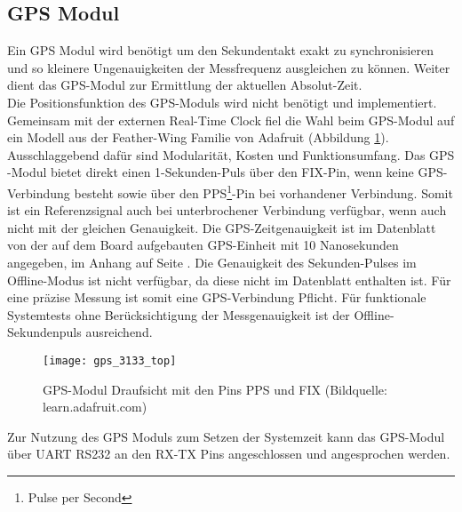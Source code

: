 \subsection{GPS Modul}
\label{cap:gps_modul}
	Ein GPS Modul wird benötigt um den Sekundentakt exakt zu synchronisieren und so kleinere Ungenauigkeiten der Messfrequenz ausgleichen zu können. Weiter dient das GPS-Modul zur Ermittlung der aktuellen Absolut-Zeit.\\
	Die Positionsfunktion des GPS-Moduls wird nicht benötigt und implementiert. Gemeinsam mit der externen Real-Time Clock fiel die Wahl beim GPS-Modul auf ein Modell aus der Feather-Wing Familie von Adafruit (Abbildung \ref{fig:GPS3133}).
	Ausschlaggebend dafür sind Modularität, Kosten und Funktionsumfang. Das GPS -Modul bietet direkt einen 1-Sekunden-Puls über den FIX-Pin, wenn keine GPS-Verbindung besteht sowie über den PPS\footnote{Pulse per Second}-Pin bei vorhandener Verbindung. Somit ist ein Referenzsignal auch bei unterbrochener Verbindung verfügbar, wenn auch nicht mit der gleichen Genauigkeit.
	Die GPS-Zeitgenauigkeit ist im Datenblatt von der auf dem Board aufgebauten GPS-Einheit mit 10 Nanosekunden angegeben, im Anhang auf Seite \pageref{app:gps_occuracy}. 
	Die Genauigkeit des Sekunden-Pulses im Offline-Modus ist nicht verfügbar, da diese nicht im Datenblatt enthalten ist. Für eine präzise Messung ist somit eine GPS-Verbindung Pflicht. Für funktionale Systemtests ohne Berücksichtigung der Messgenauigkeit ist der Offline-Sekundenpuls ausreichend.
		\begin{figure}[H]
        	\centering
        	\texttt{[image: gps\_3133\_top]}
        	\caption{GPS-Modul Draufsicht mit den Pins PPS und FIX (Bildquelle: learn.adafruit.com)}
        	\label{fig:GPS3133}
    	\end{figure}
	\noindent Zur Nutzung des GPS Moduls zum Setzen der Systemzeit kann das GPS-Modul über UART RS232 an den RX-TX Pins angeschlossen und angesprochen werden.
%
%	
